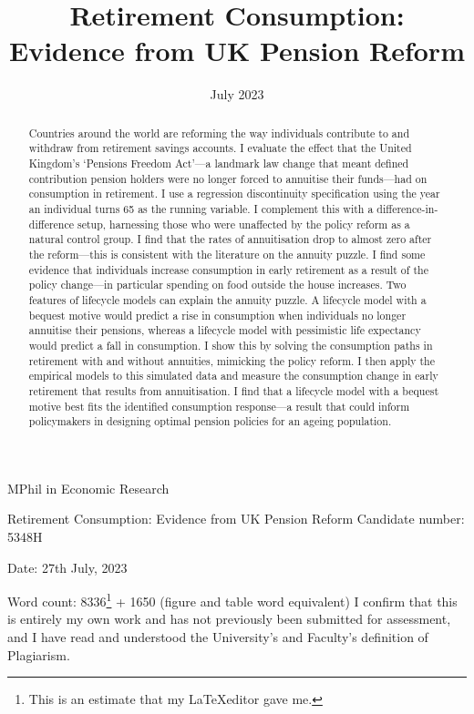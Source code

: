 \documentclass[12pt]{article}
\date{July 2023}
\title{Retirement Consumption: Evidence from UK Pension Reform}
\begin{document}
\begin{titlepage}
  \begin{center}

    \normalsize
    {MPhil in Economic Research}
    \vfill

    \huge
    Retirement Consumption: Evidence from UK Pension Reform
    \vfill
    \normalsize
    Candidate number: 5348H

    Date: 27th July, 2023

    Word count: 8336\footnote{This is an estimate that my \LaTeX editor gave me.} + 1650 (figure and table word equivalent)
    \vfill
    I confirm that this is entirely my own work and has not previously been submitted for assessment, and I have read and understood the University's and Faculty's definition of Plagiarism.
  \end{center}
\end{titlepage}
\newpage
\maketitle
\begin{abstract}
  \begin{singlespace}
    Countries around the world are reforming the way individuals contribute to and withdraw from retirement savings accounts.
    I evaluate the effect that the United Kingdom's `Pensions Freedom Act'---a landmark law change that meant defined contribution pension
    holders were no longer forced to annuitise their funds---had on consumption in retirement.
    I use a regression discontinuity specification using the year an individual turns 65 as the running variable.
    I complement this with a difference-in-difference setup, harnessing those who were unaffected by the policy reform as a natural control group.
    I find that the rates of annuitisation drop to almost zero after the reform---this is consistent with the literature on the annuity puzzle.
    I find some evidence that individuals increase consumption in early retirement as a result of the policy change---in particular spending on food outside the house increases.
    Two features of lifecycle models can explain the annuity puzzle.
    A lifecycle model with a bequest motive would predict a rise in consumption when individuals no longer annuitise their pensions, whereas a lifecycle model with pessimistic life expectancy would predict a fall in consumption.
    I show this by solving the consumption paths in retirement with and without annuities, mimicking the policy reform.
    I then apply the empirical models to this simulated data and measure the consumption change in early retirement that results from annuitisation.
    I find that a lifecycle model with a bequest motive best fits the identified consumption response---a result that could inform policymakers in designing optimal pension policies for an ageing population.
  \end{singlespace}
\end{abstract}
\newpage
\end{document}
